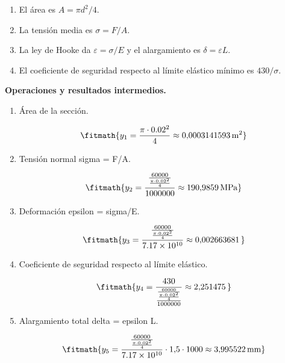 \begin{enumerate}

\item El área es $A = \pi d^2/4$.

\item La tensión media es $\sigma = F/A$.

\item La ley de Hooke da $\varepsilon = \sigma/E$ y el alargamiento es $\delta = \varepsilon L$.

\item El coeficiente de seguridad respecto al límite elástico mínimo es $430/\sigma$.

\end{enumerate}

\noindent\textbf{Operaciones y resultados intermedios.}

\begin{enumerate}

\item Área de la sección.

\[\fitmath{y_{1}=\frac{\pi\cdot {0.02}^{2}}{4}\approx 0{,}0003141593\,\mathrm{m^{2}}}\]

\item Tensión normal sigma = F/A.

\[\fitmath{y_{2}=\frac{\frac{60000}{\frac{\pi\cdot {0.02}^{2}}{4}}}{1000000}\approx 190{,}9859\,\mathrm{MPa}}\]

\item Deformación epsilon = sigma/E.

\[\fitmath{y_{3}=\frac{\frac{60000}{\frac{\pi\cdot {0.02}^{2}}{4}}}{7.17\times10^{10}}\approx 0{,}002663681\,}\]

\item Coeficiente de seguridad respecto al límite elástico.

\[\fitmath{y_{4}=\frac{430}{\frac{\frac{60000}{\frac{\pi\cdot {0.02}^{2}}{4}}}{1000000}}\approx 2{,}251475\,}\]

\item Alargamiento total delta = epsilon L.

\[\fitmath{y_{5}=\frac{\frac{60000}{\frac{\pi\cdot {0.02}^{2}}{4}}}{7.17\times10^{10}}\cdot 1{,}5\cdot 1000\approx 3{,}995522\,\mathrm{mm}}\]

\end{enumerate}

